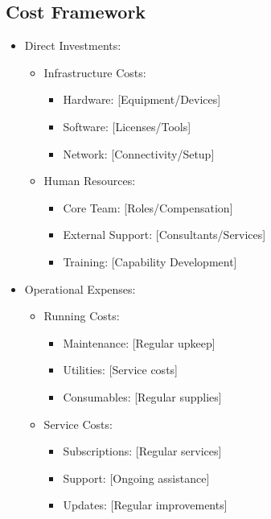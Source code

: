 \documentclass{article}
\begin{document}
\subsection{Cost Framework}
\begin{itemize}
    \item Direct Investments:
    \begin{itemize}
        \item Infrastructure Costs:
        \begin{itemize}
            \item Hardware: [Equipment/Devices]
            \item Software: [Licenses/Tools]
            \item Network: [Connectivity/Setup]
        \end{itemize}
        \item Human Resources:
        \begin{itemize}
            \item Core Team: [Roles/Compensation]
            \item External Support: [Consultants/Services]
            \item Training: [Capability Development]
        \end{itemize}
    \end{itemize}
    \item Operational Expenses:
    \begin{itemize}
        \item Running Costs:
        \begin{itemize}
            \item Maintenance: [Regular upkeep]
            \item Utilities: [Service costs]
            \item Consumables: [Regular supplies]
        \end{itemize}
        \item Service Costs:
        \begin{itemize}
            \item Subscriptions: [Regular services]
            \item Support: [Ongoing assistance]
            \item Updates: [Regular improvements]
        \end{itemize}
    \end{itemize}
\end{itemize}
\end{document}
